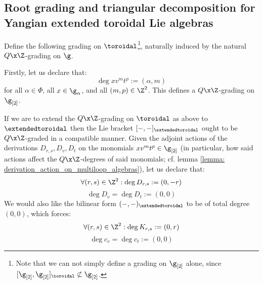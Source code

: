     \subsection{Root grading and triangular decomposition for Yangian extended toroidal Lie algebras}
        \begin{proposition} \label{prop: root_grading_on_extended_toroidal_lie_algebras}
            Define the following grading on $\toroidal$\footnote{Note that we can not simply define a grading on $\g_{[2]}$ alone, since $[\g_{[2]}, \g_{[2]}]_{\toroidal} \not \subset \g_{[2]}$.}, naturally induced by the natural $Q \x \Z$-grading on $\g$.
            
            Firstly, let us declare that:
                $$\deg x v^m t^p := (\alpha, m)$$
            for all $\alpha \in \Phi$, all $x \in \g_{\alpha}$, and all $(m, p) \in \Z^2$. This defines a $Q \x \Z$-grading on $\g_{[2]}$. 
            
            If we are to extend the $Q \x \Z$-grading on $\toroidal$ as above to $\extendedtoroidal$ then the Lie bracket $[-, -]_{\extendedtoroidal}$ ought to be $Q \x \Z$-graded in a compatible manner. Given the adjoint actions of the derivations $D_{r, s}, D_v, D_t$ on the monomials $x v^m t^p \in \g_{[2]}$ (in particular, how said actions affect the $Q \x \Z$-degrees of said monomials; cf. lemma \ref{lemma: derivation_action_on_multiloop_algebras}), let us declare that:
                $$\forall (r, s) \in \Z^2: \deg D_{r, s} := (0, -r)$$
                $$\deg D_v = \deg D_t := (0, 0)$$
            We would also like the bilinear form $(-, -)_{\extendedtoroidal}$ to be of total degree $(0, 0)$, which forces:
                $$\forall (r, s) \in \Z^2: \deg K_{r, s} := (0, r)$$
                $$\deg c_v = \deg c_t := (0, 0)$$
        \end{proposition}
